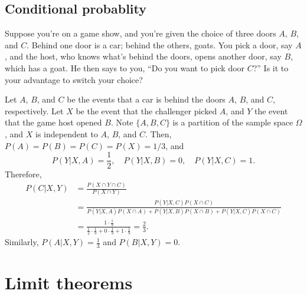\documentclass{../note}
\begin{document}
\begin{prb}

\end{prb}







\chapter{Conditional probablity}

\begin{prb}
Suppose you're on a game show, and you're given the choice of three doors $A$, $B$, and $C$.
Behind one door is a car; behind the others, goats.
You pick a door, say $A$, and the host, who knows what's behind the doors, opens another door, say $B$, which has a goat.
He then says to you, ``Do you want to pick door $C$?''
Is it to your advantage to switch your choice?
\end{prb}
\begin{pf}
Let $A$, $B$, and $C$ be the events that a car is behind the doors $A$, $B$, and $C$, respectively.
Let $X$ be the event that the challenger picked $A$, and $Y$ the event that the game host opened $B$.
Note $\{A,B,C\}$ is a partition of the sample space $\Omega$, and $X$ is independent to $A$, $B$, and $C$.
Then, $P(A)=P(B)=P(C)=P(X)=1/3$, and
\[P(Y|X,A)=\frac12,\quad P(Y|X,B)=0,\quad P(Y|X,C)=1.\]
Therefore,
\begin{align*}
P(C|X,Y)&=\frac{P(X\cap Y\cap C)}{P(X\cap Y)}\\
&=\frac{P(Y|X,C)P(X\cap C)}{P(Y|X,A)P(X\cap A)+P(Y|X,B)P(X\cap B)+P(Y|X,C)P(X\cap C)}\\
&=\frac{1\cdot \frac19}{\frac12\cdot\frac19+0\cdot\frac19+1\cdot\frac19}=\frac23.
\end{align*}
Similarly, $P(A|X,Y)=\frac13$ and $P(B|X,Y)=0$.
\end{pf}





\chapter{}









\part{Limit theorems}
\end{document}
